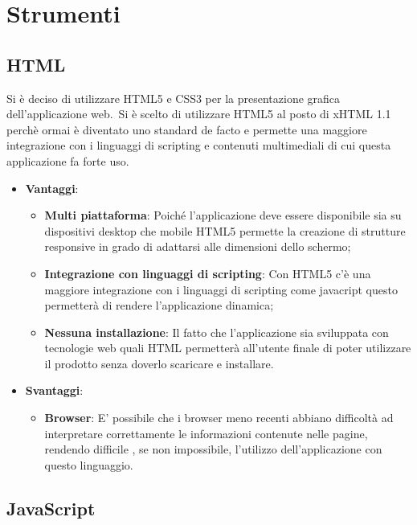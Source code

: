 \section{Strumenti}
\subsection{HTML}
Si è deciso di utilizzare HTML5 e CSS3 per la presentazione grafica dell'applicazione web.\
Si è scelto di utilizzare HTML5 al posto di xHTML 1.1 perchè ormai è diventato uno standard de facto e permette una maggiore integrazione con i linguaggi di scripting e contenuti multimediali
di cui questa applicazione fa forte uso.

\begin{itemize}
\item \textbf{Vantaggi}: 
\begin{itemize}
\item \textbf{Multi piattaforma}: Poiché l'applicazione deve essere disponibile sia su dispositivi desktop che mobile HTML5 permette la creazione di strutture responsive in grado di adattarsi alle dimensioni dello schermo;
\item \textbf{Integrazione con linguaggi di scripting}: Con HTML5 c'è una maggiore integrazione con i linguaggi di scripting come javacript questo permetterà di rendere l'applicazione dinamica;
\item \textbf{Nessuna installazione}: Il fatto che l'applicazione sia sviluppata con tecnologie web quali HTML permetterà all'utente finale di poter utilizzare il prodotto senza doverlo scaricare e installare.
\end{itemize}
\item \textbf{Svantaggi}:
\begin{itemize}


\item \textbf{Browser}: E' possibile che i browser meno recenti abbiano difficoltà ad interpretare correttamente le informazioni contenute nelle pagine, rendendo difficile , se non impossibile, l'utilizzo dell'applicazione con questo linguaggio.
\end{itemize}
\end{itemize}
\subsection{JavaScript}

